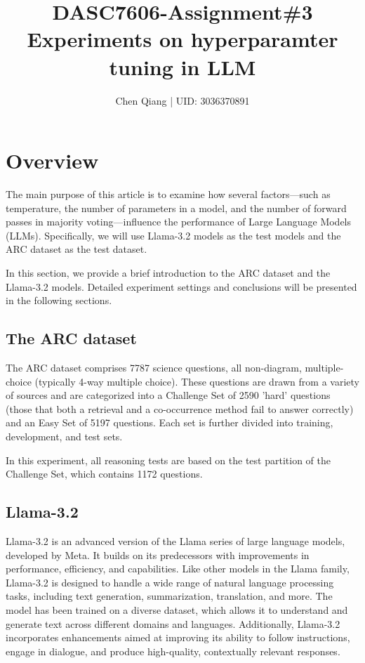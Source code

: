 \documentclass[
	a4paper, %
	10pt, %
	twoside, %
]{LTJournalArticle}
\title{DASC7606-Assignment\#3\\ Experiments on hyperparamter tuning in LLM} %
\author{Chen Qiang | UID: 3036370891}
\begin{document}
\maketitle %


\section{Overview}

The main purpose of this article is to examine how several factors—such as temperature, the number of parameters in a model, and the number of forward passes in majority voting—influence the performance of Large Language Models (LLMs). Specifically, we will use Llama-3.2 models as the test models and the ARC dataset as the test dataset.

In this section, we provide a brief introduction to the ARC dataset\autocite{clark2018thinksolvedquestionanswering} and the Llama-3.2 models\autocite{dubey2024llama3herdmodels}. Detailed experiment settings and conclusions will be presented in the following sections.

\subsection{The ARC dataset}

The ARC dataset\autocite{clark2018thinksolvedquestionanswering} comprises 7787 science questions, all non-diagram, multiple-choice (typically 4-way multiple choice). These questions are drawn from a variety of sources and are categorized into a Challenge Set of 2590 'hard' questions (those that both a retrieval and a co-occurrence method fail to answer correctly) and an Easy Set of 5197 questions. Each set is further divided into training, development, and test sets.

In this experiment, all reasoning tests are based on the test partition of the Challenge Set, which contains 1172 questions.

\subsection{Llama-3.2}

Llama-3.2\autocite{dubey2024llama3herdmodels} is an advanced version of the Llama series of large language models, developed by Meta. It builds on its predecessors with improvements in performance, efficiency, and capabilities. Like other models in the Llama family, Llama-3.2 is designed to handle a wide range of natural language processing tasks, including text generation, summarization, translation, and more. The model has been trained on a diverse dataset, which allows it to understand and generate text across different domains and languages. Additionally, Llama-3.2 incorporates enhancements aimed at improving its ability to follow instructions, engage in dialogue, and produce high-quality, contextually relevant responses.
\end{document}
